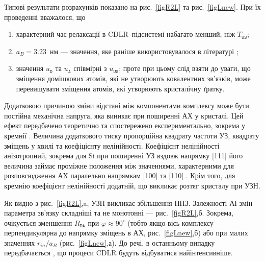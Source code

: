 Типові результати розрахунків показано на рис.~\ref{figR2L} та рис.~\ref{figLnew}.
При їх проведенні вважалося, що
\begin{enumerate}[label=\asbuk*),leftmargin=0em,itemindent=1.5em]
\item характерний час релаксації в CDLR--підсистемі набагато менший, ніж $T_\mathtt{US}$;
\item $a_B=3.23$~нм --- значення, яке раніше використовувалося в літературі \cite{CDLR:JAP};
\item значення $u_\mathtt{D}$ та $u_\mathtt{A}$ співмірні з $u_\mathtt{US}$;
   проте при цьому слід взяти до уваги, що зміщення домішкових атомів, які не утворюють ковалентних зв'язків, може перевищувати
   зміщення атомів, які утворюють кристалічну ґратку.
\end{enumerate}

Додатковою причиною зміни відстані між компонентами комплексу може бути постійна механічна напруга,
яка виникає при поширенні АХ у кристалі.
Цей ефект передбачено теоретично \cite{Thurston,StaticStrain:PhysRevB30I} та
спостережено експериментально, зокрема у кремнії \cite{StaticStrain:PhysRevB30II}.
Величина додаткового тиску пропорційна квадрату частоти УЗ, квадрату зміщень у хвилі та коефіцієнту нелінійності\cite{StaticStrain:PhysRevB30II}.
Коефіцієнт нелінійності анізотропний, зокрема для Si при
поширенні УЗ вздовж напрямку [111] його величина займає проміжне положення між значеннями, характерними для розповсюдження АХ
паралельно напрямкам [100] та [110] \cite{NelinSi}.
Крім того, для кремнію коефіцієнт нелінійності додатній, що викликає розтяг кристалу при УЗН.




Як видно з рис.~\ref{figR2L},a, УЗН викликає збільшення ППЗ.
Залежності АІ змін параметра зв'язку складніші та не монотонні --- рис.~\ref{figR2L},б.
Зокрема, очікується  зменшення $R_{\mathtt{DA}}$ при $\varphi\approx90^\circ$ (тобто якщо вісь комплексу перпендикулярна до напрямку зміщень в АХ, рис.~\ref{figLnew},б)
або при малих значеннях $r_{in}/a_B$ (рис.~\ref{figLnew},а).
До речі, в останньому випадку передбачається \cite{CDLR:JAP1995,CDLR:JAP}, що процеси CDLR будуть відбуватися найінтенсивніше.

